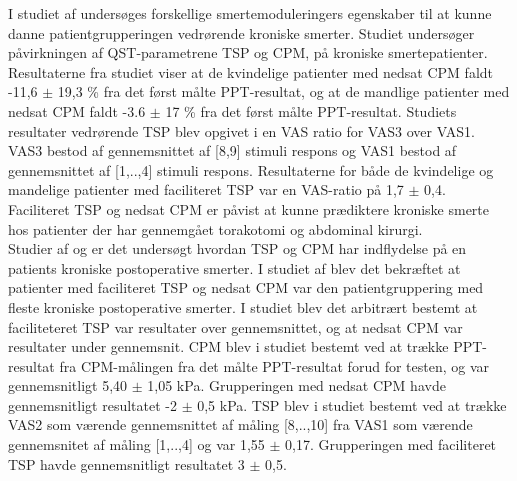 I studiet af  undersøges forskellige smertemoduleringers egenskaber til at kunne danne patientgrupperingen vedrørende kroniske smerter. Studiet undersøger påvirkningen af QST-parametrene TSP og CPM, på kroniske smertepatienter. Resultaterne fra studiet viser at de kvindelige patienter med nedsat CPM faldt -11,6 $\pm$ 19,3 \% fra det først målte PPT-resultat, og at de mandlige patienter med nedsat CPM faldt -3.6 $\pm$ 17 \% fra det først målte PPT-resultat. Studiets resultater vedrørende TSP blev opgivet i en VAS ratio for VAS3 over VAS1. VAS3 bestod af gennemsnittet af [8,9] stimuli respons og VAS1 bestod af gennemsnittet af [1,..,4] stimuli respons. Resultaterne for både de kvindelige og mandelige patienter med faciliteret TSP var en VAS-ratio på 1,7 $\pm$ 0,4. Faciliteret TSP og nedsat CPM er påvist at kunne prædiktere kroniske smerte hos patienter der har gennemgået torakotomi og abdominal kirurgi. \citep{Vaegter2016} \\
Studier af  og  er det undersøgt hvordan TSP og CPM har indflydelse på en patients kroniske postoperative smerter. I studiet af  blev det bekræftet at patienter med faciliteret TSP og nedsat CPM var den patientgruppering med fleste kroniske postoperative smerter. I studiet blev det arbitrært bestemt at faciliteteret TSP var resultater over gennemsnittet, og at nedsat CPM var resultater under gennemsnit. CPM blev i studiet bestemt ved at trække PPT-resultat fra CPM-målingen fra det målte PPT-resultat forud for testen, og var gennemsnitligt 5,40 $\pm$ 1,05 kPa. Grupperingen med nedsat CPM havde gennemsnitligt resultatet -2 $\pm$ 0,5 kPa. TSP blev i studiet bestemt ved at trække VAS2 som værende gennemsnittet af måling [8,..,10] fra VAS1 som værende gennemsnitet af måling [1,..,4] og var 1,55 $\pm$ 0,17. Grupperingen med faciliteret TSP havde gennemsnitligt resultatet 3 $\pm$ 0,5. 

\begin{table}[H]
	\centering
	\caption{I tabellen ses resultaterne vedrørende CPM og TSP målinger på gruppering med nedsat CPM og faciliteret TSP.}
	\label{tab:CPM_TSP}
\end{table}


